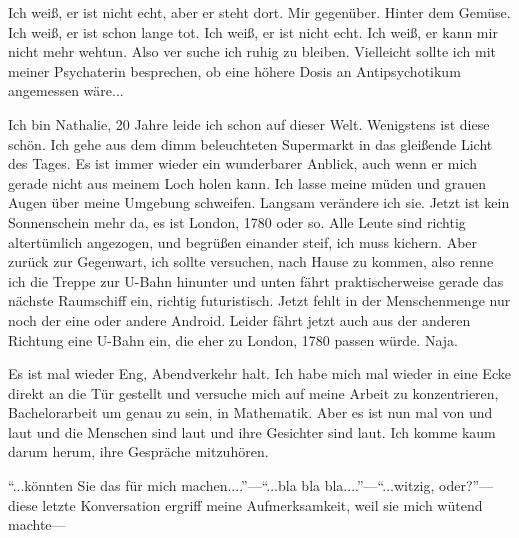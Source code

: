 \documentclass{article}
\title{\titlevar}
\author{\authorvar}
\date{\datevar}
\newcommand{\ms}{\medskip}
\begin{document}
	\maketitle

	Ich weiß, er ist nicht echt, aber er steht dort. Mir gegenüber. Hinter dem Gemüse. Ich weiß, er ist schon lange tot. Ich weiß, er ist nicht echt. Ich weiß, er kann mir nicht mehr wehtun. Also ver suche ich ruhig zu bleiben. Vielleicht sollte ich mit meiner Psychaterin besprechen, ob eine höhere Dosis an Antipsychotikum angemessen wäre...

	\ms

	Ich bin Nathalie, 20 Jahre leide ich schon auf dieser Welt. Wenigstens ist diese schön. Ich gehe aus dem dimm beleuchteten Supermarkt in das gleißende Licht des Tages. Es ist immer wieder ein wunderbarer Anblick, auch wenn er mich gerade nicht aus meinem Loch holen kann. Ich lasse meine müden und grauen Augen über meine Umgebung schweifen. Langsam verändere ich sie. Jetzt ist kein Sonnenschein mehr da, es ist London, 1780 oder so. Alle Leute sind richtig altertümlich angezogen, und begrüßen einander steif, ich muss kichern. Aber zurück zur Gegenwart, ich sollte versuchen, nach Hause zu kommen, also renne ich die Treppe zur U-Bahn hinunter und unten fährt praktischerweise gerade das nächste Raumschiff ein, richtig futuristisch. Jetzt fehlt in der Menschenmenge nur noch der eine oder andere Android. Leider fährt jetzt auch aus der anderen Richtung eine U-Bahn ein, die eher zu London, 1780 passen würde. Naja.

	\ms

	Es ist mal wieder Eng, Abendverkehr halt. Ich habe mich mal wieder in eine Ecke direkt an die Tür gestellt und versuche mich auf meine Arbeit zu konzentrieren, Bachelorarbeit um genau zu sein, in Mathematik. Aber es ist nun mal von und laut und die Menschen sind laut und ihre Gesichter sind laut. Ich komme kaum darum herum, ihre Gespräche mitzuhören.

	\ms

	\enquote{...könnten Sie das für mich machen....}—\enquote{...bla bla bla....}—\enquote{...witzig, oder?}—diese letzte Konversation ergriff meine Aufmerksamkeit, weil sie mich wütend machte—
\end{document}
